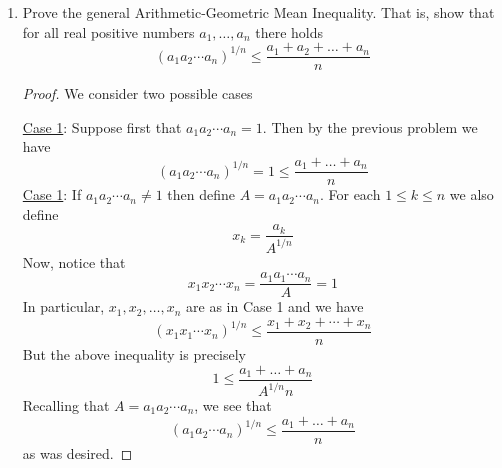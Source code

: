 \documentclass[12pt, reqno]{article}
\numberwithin{equation}{section}
\theoremstyle{definition}
\theoremstyle{remark}
\newcommand{\NN}{\mathbb{N}}
\begin{document}
\begin{enumerate}[leftmargin=*]
	      \begin{proof} Equivalently, we will prove that $a_1+a_2+\dots +a_n \geq n$.
		      We prove this by induction. The case $n=1$ is clear. Now, suppose the statement holds for some $n\in \NN$ and let $a_1, \dots, a_{n+1}$ be real positive numbers. If $a_1 = a_2 = \dots = a_{n+1} = 1$, then the inequality is clear. Otherwise, we may suppose without loss of generality that $a_{n+1} > 1$ and $a_n < 1$. Now, define $y = a_na_{n+1}$. By the induction hypothesis,
		      \[
			      a_1+a_2+\dots +a_{n-1} + y \geq n
		      \]
		      On the other hand, notice that $(1-a_n)(a_{n+1} - 1)> 0$ implies that $a_{n+1} + a_n \geq y + 1$. Using this and the above inequality we see that
		      \begin{align*}
			      a_1+a_2+\dots +a_{n-1} + a_n + a_{n+1}
			       & \geq a_1 + a_2 + \dots + a_{n-1} + y + 1 \\
			       & \geq n+1
		      \end{align*}
		      This completes the proof.
	      \end{proof}

	\item Prove the general Arithmetic-Geometric Mean Inequality. That is, show that for all real positive numbers $a_1, \dots, a_n$ there holds
	      \[
		      \left(a_1a_2\cdots a_n\right)^{1/n} \leq \frac{a_1+ a_2 + \dots + a_n}{n}
	      \]
	      \begin{proof} We consider two possible cases

		      \underline{Case 1}: Suppose first that $a_1 a_2\cdots a_n = 1$. Then by the previous problem we have
		      \[
			      \left(a_1 a_2\cdots a_n\right)^{1/n} = 1 \leq \frac{a_1 + \dots  + a_n}{n}
		      \]
		      \underline{Case 1}: If $a_1 a_2\cdots a_n \neq 1$ then define $A = a_1 a_2\cdots a_n$. For each $1\leq k\leq n$ we also define
		      \[
			      x_k = \frac{a_k}{A^{1/n}}
		      \]
		      Now, notice that
		      \[
			      x_1x_2\cdots x_n = \frac{a_1a_1 \cdots a_n}{A} = 1
		      \]
		      In particular, $x_1, x_2, \dots, x_n$ are as in Case 1 and we have
		      \[
			      \left(x_1x_1\cdots x_n\right)^{1/n} \leq \frac{x_1 + x_2 + \cdots +x_n}{n}
		      \]
		      But the above inequality is precisely
		      \[
			      1 \leq \frac{a_1 + \dots + a_n}{A^{1/n} n}
		      \]
		      Recalling that $A = a_1 a_2\cdots a_n$, we see that
		      \[
			      \left( a_1 a_2\cdots a_n\right)^{1/n}\leq \frac{a_1 + \dots + a_n}{n}
		      \]
		      as was desired.
	      \end{proof}

\end{enumerate}
\end{document}
